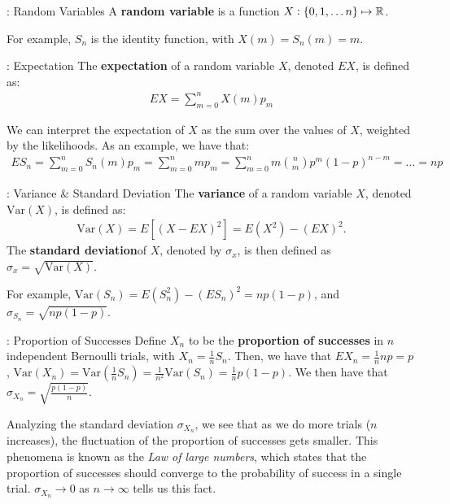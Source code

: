 \begin{ndef}{: Random Variables}{}
    A \textbf{random variable} is a function $X: \set{0, 1, \ldots n} \mapsto \mathbb{R}$. 
\end{ndef}
\noindent For example, $S_n$ is the identity function, with $X(m) = S_n(m) = m$. 

\begin{ndef}{: Expectation}{}
    The \textbf{expectation} of a random variable $X$, denoted $EX$, is defined as:
    \begin{align*}
        EX = \sum_{m=0}^n X(m)p_m
    \end{align*}
\end{ndef}
\noindent We can interpret the expectation of $X$ as the sum over the values of $X$, weighted by the likelihoods. As an example, we have that:
\begin{align*}
    ES_n = \sum_{m=0}^n S_n(m)p_m = \sum_{m=0}^n mp_m = \sum_{m=0}^n m\binom{n}{m}p^m(1-p)^{n-m} = \ldots = np
\end{align*}

\begin{ndef}{: Variance \& Standard Deviation}{}
    The \textbf{variance} of a random variable $X$, denoted $\text{Var}(X)$, is defined as:
    \begin{align*}
        \text{Var}(X) = E[(X - EX)^2] = E(X^2) - (EX)^2.
    \end{align*}
    The \textbf{standard deviation}of $X$, denoted by $\sigma_x$, is then defined as $\sigma_x = \sqrt{\text{Var}(X)}$.
\end{ndef}
\noindent For example, $\text{Var}(S_n) = E(S_n^2) - (ES_n)^2 = np(1-p)$, and $\sigma_{S_n} = \sqrt{np(1-p)}$. 

\begin{ndef}{: Proportion of Successes}{}
    Define $X_n$ to be the \textbf{proportion of successes} in $n$ independent Bernoulli trials, with $X_n = \frac{1}{n}S_n$. Then, we have that $EX_n = \frac{1}{n}np = p$, $\text{Var}(X_n) = \text{Var}(\frac{1}{n}S_n) = \frac{1}{n^2}\text{Var}(S_n)= \frac{1}{n}p(1-p)$. We then have that $\sigma_{X_n} = \sqrt{\frac{p(1-p)}{n}}$.
\end{ndef}
\noindent Analyzing the standard deviation $\sigma_{X_n}$, we see that as we do more trials ($n$ increases), the fluctuation of the proportion of successes gets smaller. This phenomena is known as the \emph{Law of large numbers}, which states that the proportion of successes should converge to the probability of success in a single trial. $\sigma_{X_n} \rightarrow 0$ as $n \rightarrow \infty$ tells us this fact. 

